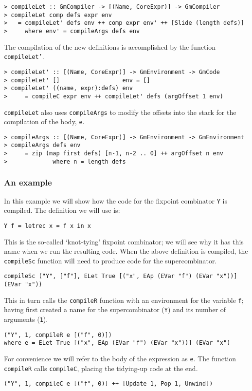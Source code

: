 \begin{verbatim}
> compileLet :: GmCompiler -> [(Name, CoreExpr)] -> GmCompiler
> compileLet comp defs expr env
>   = compileLet' defs env ++ comp expr env' ++ [Slide (length defs)]
>     where env' = compileArgs defs env
\end{verbatim}
%
%
\par
The compilation of the new definitions is accomplished by the function
\mbox{\tt compileLet'}.
\begin{verbatim}
> compileLet' :: [(Name, CoreExpr)] -> GmEnvironment -> GmCode
> compileLet' []                  env = []
> compileLet' ((name, expr):defs) env
>     = compileC expr env ++ compileLet' defs (argOffset 1 env)
\end{verbatim}
\mbox{\tt compileLet} also uses \mbox{\tt compileArgs} to modify the offsets into the
stack for the compilation of the body, \mbox{\tt e}.
\begin{verbatim}
> compileArgs :: [(Name, CoreExpr)] -> GmEnvironment -> GmEnvironment
> compileArgs defs env
>     = zip (map first defs) [n-1, n-2 .. 0] ++ argOffset n env
>             where n = length defs
\end{verbatim}
%
%
\subsubsection{An example}

In this example we will show how the code for the fixpoint combinator
\mbox{\tt Y} is compiled.
The definition we will use is:
\begin{verbatim}
Y f = letrec x = f x in x
\end{verbatim}
This is the so-called `knot-tying' fixpoint
combinator; we will see why it has this
name when we run the resulting code.  When the above definition is
compiled, the \mbox{\tt compileSc} function will need to produce code for the
supercombinator.
\begin{verbatim}
compileSc ("Y", ["f"], ELet True [("x", EAp (EVar "f") (EVar "x"))] (EVar "x"))
\end{verbatim}
This in turn calls the \mbox{\tt compileR} function with an environment for the
variable \mbox{\tt f}; having first created a name for the supercombinator
(\mbox{\tt Y}) and its number of arguments (\mbox{\tt 1}).
\begin{verbatim}
("Y", 1, compileR e [("f", 0)])
where e = ELet True [("x", EAp (EVar "f") (EVar "x"))] (EVar "x")
\end{verbatim}
For convenience we will refer to the body of the expression as \mbox{\tt e}.
The function \mbox{\tt compileR} calls \mbox{\tt compileC}, placing the tidying-up code
at the end.
\begin{verbatim}
("Y", 1, compileC e [("f", 0)] ++ [Update 1, Pop 1, Unwind])
\end{verbatim}

